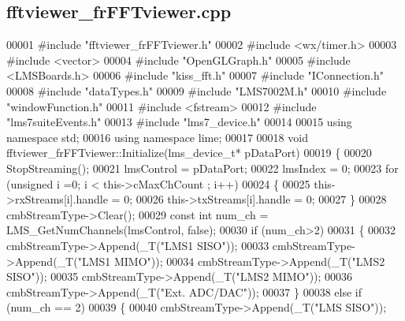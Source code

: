 \subsection{fftviewer\+\_\+fr\+F\+F\+Tviewer.\+cpp}
\label{fftviewer__frFFTviewer_8cpp_source}

\begin{DoxyCode}
00001 \textcolor{preprocessor}{#include "fftviewer_frFFTviewer.h"}
00002 \textcolor{preprocessor}{#include <wx/timer.h>}
00003 \textcolor{preprocessor}{#include <vector>}
00004 \textcolor{preprocessor}{#include "OpenGLGraph.h"}
00005 \textcolor{preprocessor}{#include <LMSBoards.h>}
00006 \textcolor{preprocessor}{#include "kiss_fft.h"}
00007 \textcolor{preprocessor}{#include "IConnection.h"}
00008 \textcolor{preprocessor}{#include "dataTypes.h"}
00009 \textcolor{preprocessor}{#include "LMS7002M.h"}
00010 \textcolor{preprocessor}{#include "windowFunction.h"}
00011 \textcolor{preprocessor}{#include <fstream>}
00012 \textcolor{preprocessor}{#include "lms7suiteEvents.h"}
00013 \textcolor{preprocessor}{#include "lms7_device.h"}
00014 
00015 \textcolor{keyword}{using namespace }std;
00016 \textcolor{keyword}{using namespace }lime;
00017 
00018 \textcolor{keywordtype}{void} fftviewer_frFFTviewer::Initialize(lms_device_t* pDataPort)
00019 \{
00020     StopStreaming();
00021     lmsControl = pDataPort;
00022     lmsIndex = 0;
00023     \textcolor{keywordflow}{for} (\textcolor{keywordtype}{unsigned} i =0; i < this->cMaxChCount ; i++)
00024     \{
00025         this->rxStreams[i].handle = 0;
00026         this->txStreams[i].handle = 0;
00027     \}
00028     cmbStreamType->Clear();
00029     \textcolor{keyword}{const} \textcolor{keywordtype}{int} num\_ch = LMS_GetNumChannels(lmsControl, \textcolor{keyword}{false});
00030     \textcolor{keywordflow}{if} (num\_ch>2)
00031     \{
00032         cmbStreamType->Append(_T(\textcolor{stringliteral}{"LMS1 SISO"}));
00033         cmbStreamType->Append(_T(\textcolor{stringliteral}{"LMS1 MIMO"}));
00034         cmbStreamType->Append(_T(\textcolor{stringliteral}{"LMS2 SISO"}));
00035         cmbStreamType->Append(_T(\textcolor{stringliteral}{"LMS2 MIMO"}));
00036         cmbStreamType->Append(_T(\textcolor{stringliteral}{"Ext. ADC/DAC"}));
00037     \}
00038     \textcolor{keywordflow}{else} \textcolor{keywordflow}{if} (num\_ch == 2)
00039     \{
00040         cmbStreamType->Append(_T(\textcolor{stringliteral}{"LMS SISO"}));

\end{DoxyCode}

